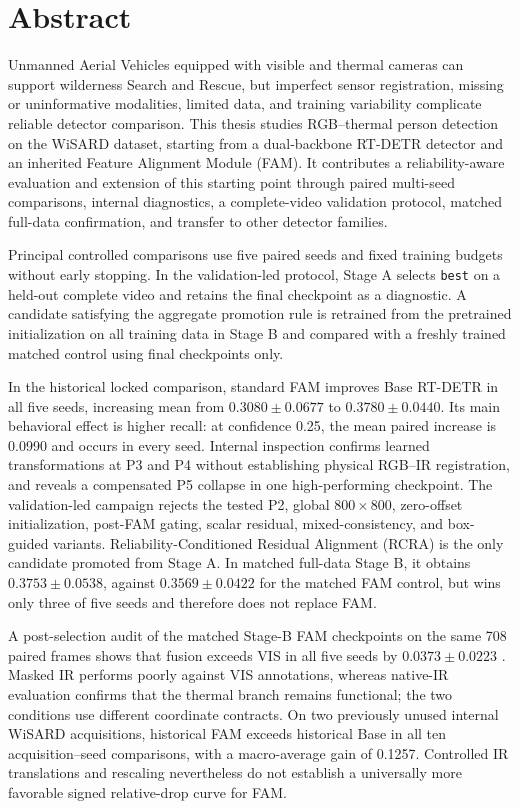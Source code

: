 \chapter*{Abstract}

Unmanned Aerial Vehicles equipped with visible and thermal cameras can support
wilderness Search and Rescue, but imperfect sensor registration, missing or
uninformative modalities, limited data, and training variability complicate
reliable detector comparison. This thesis studies RGB--thermal person detection
on the WiSARD dataset, starting from a dual-backbone RT-DETR detector and an
inherited Feature Alignment Module (FAM). It contributes a reliability-aware
evaluation and extension of this starting point through paired multi-seed
comparisons, internal diagnostics, a complete-video validation protocol,
matched full-data confirmation, and transfer to other detector families.

Principal controlled comparisons use five paired seeds and fixed training
budgets without early stopping. In the validation-led protocol, Stage A selects
\texttt{best} on a held-out complete video and retains the final checkpoint as
a diagnostic. A candidate satisfying the aggregate promotion rule is retrained
from the pretrained initialization on all training data in Stage B and compared
with a freshly trained matched control using final checkpoints only.

In the historical locked comparison, standard FAM improves Base RT-DETR in all
five seeds, increasing mean \mapfifty{} from \(0.3080\pm0.0677\) to
\(0.3780\pm0.0440\). Its main behavioral effect is higher recall: at confidence
0.25, the mean paired increase is 0.0990 and occurs in every seed. Internal
inspection confirms learned transformations at P3 and P4 without establishing
physical RGB--IR registration, and reveals a compensated P5 collapse in one
high-performing checkpoint. The validation-led campaign rejects the tested P2,
global \(800\times800\), zero-offset initialization, post-FAM gating, scalar
residual, mixed-consistency, and box-guided variants. Reliability-Conditioned
Residual Alignment (RCRA) is the only candidate promoted from Stage A. In
matched full-data Stage B, it
obtains \(0.3753\pm0.0538\), against \(0.3569\pm0.0422\) for the matched FAM
control, but wins only three of five seeds and therefore does not replace FAM.

A post-selection audit of the matched Stage-B FAM checkpoints on the same 708
paired frames shows that fusion exceeds VIS in all five seeds by
\(0.0373\pm0.0223\) \mapfifty{}. Masked IR performs poorly against VIS
annotations, whereas native-IR evaluation confirms that the thermal branch
remains functional; the two conditions use different coordinate contracts.
On two previously unused internal WiSARD acquisitions, historical FAM exceeds
historical Base in all ten acquisition--seed comparisons, with a macro-average
gain of 0.1257. Controlled IR translations and rescaling nevertheless do not
establish a universally more favorable signed relative-drop curve for FAM.

